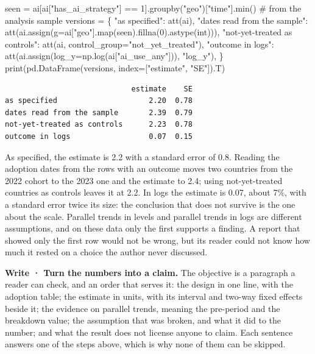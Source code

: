 \documentclass[
  letterpaper,
  10pt,
  twoside,
  openright,
  numbers=noenddot,
  chapterprefix=true]{scrbook}
\newenvironment{Shaded}{}{}
\newcommand{\BuiltInTok}[1]{\textcolor[rgb]{0.84,0.23,0.29}{#1}}
\newcommand{\CommentTok}[1]{\textcolor[rgb]{0.42,0.45,0.49}{#1}}
\newcommand{\DecValTok}[1]{\textcolor[rgb]{0.00,0.36,0.77}{#1}}
\newcommand{\NormalTok}[1]{\textcolor[rgb]{0.14,0.16,0.18}{#1}}
\newcommand{\OperatorTok}[1]{\textcolor[rgb]{0.14,0.16,0.18}{#1}}
\newcommand{\StringTok}[1]{\textcolor[rgb]{0.01,0.18,0.38}{#1}}
\begin{document}
\begin{Shaded}
\begin{Highlighting}[]
\NormalTok{seen }\OperatorTok{=}\NormalTok{ ai[ai[}\StringTok{"has\_ai\_strategy"}\NormalTok{] }\OperatorTok{==} \DecValTok{1}\NormalTok{].groupby(}\StringTok{"geo"}\NormalTok{)[}\StringTok{"time"}\NormalTok{].}\BuiltInTok{min}\NormalTok{()    }\CommentTok{\# from the analysis sample}
\NormalTok{versions }\OperatorTok{=}\NormalTok{ \{}
    \StringTok{"as specified"}\NormalTok{:                  att(ai),}
    \StringTok{"dates read from the sample"}\NormalTok{:    att(ai.assign(g}\OperatorTok{=}\NormalTok{ai[}\StringTok{"geo"}\NormalTok{].}\BuiltInTok{map}\NormalTok{(seen).fillna(}\DecValTok{0}\NormalTok{).astype(}\BuiltInTok{int}\NormalTok{))),}
    \StringTok{"not{-}yet{-}treated as controls"}\NormalTok{:   att(ai, control\_group}\OperatorTok{=}\StringTok{"not\_yet\_treated"}\NormalTok{),}
    \StringTok{"outcome in logs"}\NormalTok{:               att(ai.assign(log\_y}\OperatorTok{=}\NormalTok{np.log(ai[}\StringTok{"ai\_use\_any"}\NormalTok{])), }\StringTok{"log\_y"}\NormalTok{),}
\NormalTok{\}}
\BuiltInTok{print}\NormalTok{(pd.DataFrame(versions, index}\OperatorTok{=}\NormalTok{[}\StringTok{"estimate"}\NormalTok{, }\StringTok{"SE"}\NormalTok{]).T)}
\end{Highlighting}
\end{Shaded}

\begin{verbatim}
                             estimate    SE
as specified                     2.20  0.78
dates read from the sample       2.39  0.79
not-yet-treated as controls      2.23  0.78
outcome in logs                  0.07  0.15
\end{verbatim}

As specified, the estimate is 2.2 with a standard error of 0.8. Reading
the adoption dates from the rows with an outcome moves two countries
from the 2022 cohort to the 2023 one and the estimate to 2.4; using
not-yet-treated countries as controls leaves it at 2.2. In logs the
estimate is 0.07, about 7\%, with a standard error twice its size: the
conclusion that does not survive is the one about the scale. Parallel
trends in levels and parallel trends in logs are different assumptions,
and on these data only the first supports a finding. A report that
showed only the first row would not be wrong, but its reader could not
know how much it rested on a choice the author never discussed.

\textbf{Write · Turn the numbers into a claim.} The objective is a
paragraph a reader can check, and an order that serves it: the design in
one line, with the adoption table; the estimate in units, with its
interval and two-way fixed effects beside it; the evidence on parallel
trends, meaning the pre-period and the breakdown value; the assumption
that was broken, and what it did to the number; and what the result does
not license anyone to claim. Each sentence answers one of the steps
above, which is why none of them can be skipped.
\end{document}
